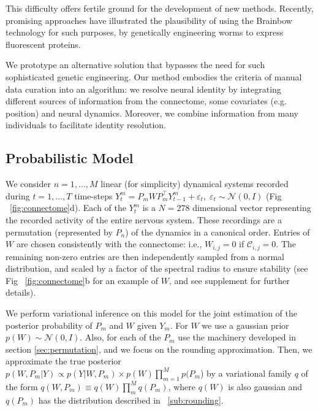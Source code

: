 \documentclass[twoside]{article}
\begin{document}
This difficulty offers fertile ground for the development of new methods. Recently, promising approaches \cite{Aoki2017} have illustrated the plausibility of using the Brainbow technology \cite{Livet2007} for such purposes, by genetically engineering worms to express fluorescent proteins. 

We prototype an alternative solution that bypasses the need for such sophisticated genetic engineering. Our method embodies the criteria of manual data curation into an algorithm: we resolve neural identity by integrating different sources of information from the connectome, some covariates (e.g. position) and neural dynamics. Moreover, we combine information from many individuals to facilitate identity resolution.

\subsection{Probabilistic Model}
We consider $n=1,\ldots, M$ linear (for simplicity) dynamical systems
recorded during $t=1,\ldots, T$ time-steps
$Y^m_t=P_mWP_m^\top
Y^m_{t-1}+\varepsilon_t,\;\varepsilon_t\sim\mathcal{N}(0,I)$ (Fig
~\ref{fig:connectome}d). Each of the $Y_t^m$ is a $N=278$ dimensional
vector representing the recorded activity of the entire nervous
system. These recordings are a permutation (represented by $P_n$) of
the dynamics in a canonical order.  Entries of
$W$ are chosen consistently with the connectome: i.e.,
$W_{i,j}=0$ if $\mathcal{C}_{i,j}=0$. The remaining non-zero entries
are then independently sampled from a normal distribution, and scaled
by a factor of the spectral radius to ensure stability (see Fig
~\ref{fig:connectome}b for an example of $W$, and see supplement for
further details).

We perform variational inference on this model for the joint
estimation of the posterior probability of $P_m$ and $W$ given
$Y_m$. For $W$ we use a gaussian prior $p(W)\sim \mathcal{N}(0,
I)$. Also, for each of the $P_m$ use the machinery developed in
section \ref{sec:permutation}, and we focus on the rounding
approximation.  Then, we approximate the true posterior
$p(W,P_m|Y)\propto p(Y|W,P_m)\times p(W)\prod_{m=1}^M p(P_m$) by a
variational family $q$ of the form
$q(W,P_m)\equiv q(W)\prod_m^M q(P_m)$, where $q(W)$ is also gaussian
and $q(P_m)$ has the distribution described in ~\ref{sub:rounding}.
\end{document}
